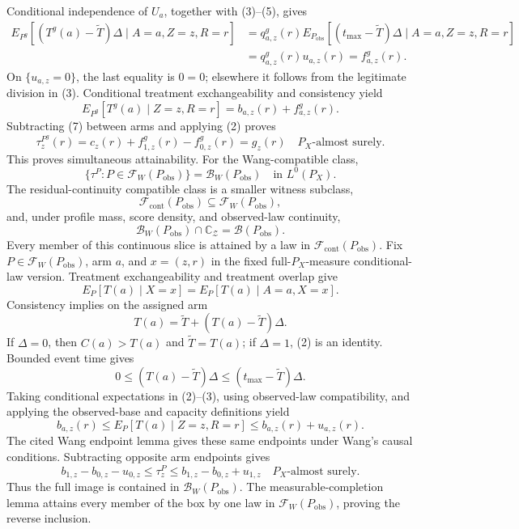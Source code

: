 Conditional independence of \(U_a\), together with (3)--(5), gives
\[
\begin{aligned}
E_{P^g}[(T^g(a)-\widetilde T)\Delta\mid A=a,Z=z,R=r]
&=q^g_{a,z}(r)
E_{P_{\mathrm{obs}}}[(t_{\max}-\widetilde T)\Delta\mid A=a,Z=z,R=r]\\
&=q^g_{a,z}(r)u_{a,z}(r)
=f^g_{a,z}(r).
\end{aligned}
\tag{6}
\]
On \(\{u_{a,z}=0\}\), the last equality is \(0=0\); elsewhere it follows from the legitimate division in (3).  Conditional treatment exchangeability and consistency yield
\[
E_{P^g}[T^g(a)\mid Z=z,R=r]=b_{a,z}(r)+f^g_{a,z}(r).
\tag{7}
\]
Subtracting (7) between arms and applying (2) proves
\[
\tau_z^{P^g}(r)=c_z(r)+f^g_{1,z}(r)-f^g_{0,z}(r)=g_z(r)
\quad P_X\text{-almost surely}.
\]
This proves simultaneous attainability.
For the Wang-compatible class,
\[
\{\tau^P:P\in\mathcal F_W(P_{\mathrm{obs}})\}
=\mathcal B_W(P_{\mathrm{obs}})
\quad\text{in }L^0(P_X).
\]
The residual-continuity compatible class is a smaller witness subclass,
\[
\mathcal F_{\mathrm{cont}}(P_{\mathrm{obs}})
\subseteq\mathcal F_W(P_{\mathrm{obs}}),
\]
and, under profile mass, score density, and observed-law continuity,
\[
\mathcal B_W(P_{\mathrm{obs}})\cap\mathbb C_{\mathcal Z}
=\mathcal B(P_{\mathrm{obs}}).
\]
Every member of this continuous slice is attained by a law in \(\mathcal F_{\mathrm{cont}}(P_{\mathrm{obs}})\).
Fix \(P\in\mathcal F_W(P_{\mathrm{obs}})\), arm \(a\), and \(x=(z,r)\) in the fixed full-\(P_X\)-measure conditional-law version.  Treatment exchangeability and treatment overlap give
\[
E_P[T(a)\mid X=x]=E_P[T(a)\mid A=a,X=x].
\tag{1}
\]
Consistency implies on the assigned arm
\[
T(a)=\widetilde T+(T(a)-\widetilde T)\Delta.
\tag{2}
\]
If \(\Delta=0\), then \(C(a)>T(a)\) and \(\widetilde T=T(a)\); if \(\Delta=1\), (2) is an identity.  Bounded event time gives
\[
0\leq(T(a)-\widetilde T)\Delta
\leq(t_{\max}-\widetilde T)\Delta.
\tag{3}
\]
Taking conditional expectations in (2)--(3), using observed-law compatibility, and applying the observed-base and capacity definitions yield
\[
b_{a,z}(r)
\leq E_P[T(a)\mid Z=z,R=r]
\leq b_{a,z}(r)+u_{a,z}(r).
\tag{4}
\]
The cited Wang endpoint lemma gives these same endpoints under Wang's causal conditions.  Subtracting opposite arm endpoints gives
\[
b_{1,z}-b_{0,z}-u_{0,z}
\leq\tau_z^P\leq
b_{1,z}-b_{0,z}+u_{1,z}
\quad P_X\text{-almost surely}.
\tag{5}
\]
Thus the full image is contained in \(\mathcal B_W(P_{\mathrm{obs}})\).  The measurable-completion lemma attains every member of the box by one law in \(\mathcal F_W(P_{\mathrm{obs}})\), proving the reverse inclusion.

